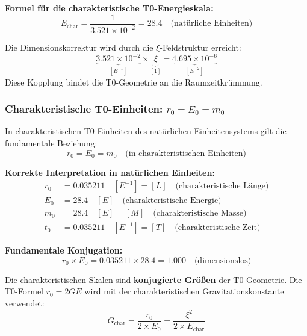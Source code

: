 	\textbf{Formel für die charakteristische T0-Energieskala:}
	\begin{equation}
		\boxed{E_{\text{char}} = \frac{1}{3.521 \times 10^{-2}} = 28.4 \quad \text{(natürliche Einheiten)}}
	\end{equation}
	
	Die Dimensionskorrektur wird durch die $\xi$-Feldstruktur erreicht:
	\begin{equation}
		\underbrace{3.521 \times 10^{-2}}_{[E^{-1}]} \times \underbrace{\xi}_{[1]} = \underbrace{4.695 \times 10^{-6}}_{[E^{-2}]}
	\end{equation}
	Diese Kopplung bindet die T0-Geometrie an die Raumzeitkrümmung.
	
	\subsubsection{Charakteristische T0-Einheiten: $r_0 = E_0 = m_0$}
	
	In charakteristischen T0-Einheiten des natürlichen Einheitensystems gilt die fundamentale Beziehung:
	\begin{equation}
		r_0 = E_0 = m_0 \quad \text{(in charakteristischen Einheiten)}
	\end{equation}
	
	\textbf{Korrekte Interpretation in natürlichen Einheiten:}
	\begin{align}
		r_0 &= 0.035211 \quad [E^{-1}] = [L] \quad \text{(charakteristische Länge)} \\
		E_0 &= 28.4 \quad [E] \quad \text{(charakteristische Energie)} \\
		m_0 &= 28.4 \quad [E] = [M] \quad \text{(charakteristische Masse)} \\
		t_0 &= 0.035211 \quad [E^{-1}] = [T] \quad \text{(charakteristische Zeit)}
	\end{align}
	
	\textbf{Fundamentale Konjugation:}
	\begin{equation}
		r_0 \times E_0 = 0.035211 \times 28.4 = 1.000 \quad \text{(dimensionslos)}
	\end{equation}
	
	Die charakteristischen Skalen sind \textbf{konjugierte Größen} der T0-Geometrie. Die T0-Formel $r_0 = 2GE$ wird mit der charakteristischen Gravitationskonstante verwendet:
	\begin{equation}
		G_{\text{char}} = \frac{r_0}{2 \times E_0} = \frac{\xi^2}{2 \times E_{\text{char}}}
	\end{equation}
	
